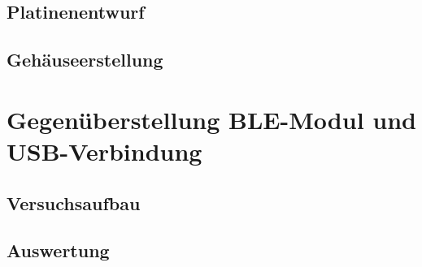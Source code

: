 

\subsection{Platinenentwurf}

\subsection{Gehäuseerstellung}

\section{Gegenüberstellung \acs{BLE}-Modul und USB-Verbindung}

\subsection{Versuchsaufbau}


\subsection{Auswertung}

